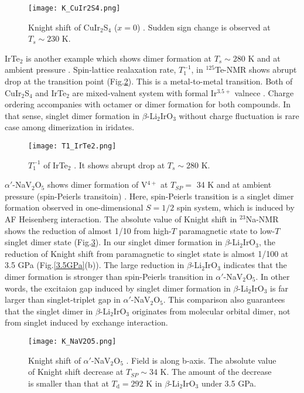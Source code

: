 \documentclass[a4,10.5pt]{report}
\begin{document}
\begin{figure}
  \centering
  \texttt{[image: K\_CuIr2S4.png]}
  \caption{Knight shift of CuIr$_2$S$_4$ ($x = 0$) \cite{Tsuji1997}. Sudden sign change is observed at $T_s \sim 230$ K.} 
  \label{K_CuIr2S4}
\end{figure}

IrTe$_2$ is another example which shows dimer formation at $T_s \sim 280$ K and at ambient pressure \cite{Pascut2014}.
Spin-lattice realaxation rate, $T^{-1}_1$, in ${}^{125}$Te-NMR shows abrupt drop at the transition point (Fig.\ref{T1_IrTe2}).
This is a metal-to-metal transition.
Both of CuIr$_2$S$_4$ and IrTe$_2$ are mixed-valnent system with formal Ir$^{3.5+}$ valnece \cite{Radaelli2002, Pascut2014}.
Charge ordering accompanies with octamer or dimer formation for both compounds.
In that sense, singlet dimer formation in $\beta$-Li$_2$IrO$_3$ without charge fluctuation is rare case among dimerization in iridates.

\begin{figure}
  \centering
  \texttt{[image: T1\_IrTe2.png]}
  \caption{$T^{-1}_1$ of IrTe$_2$ \cite{Mizuno2002}. It shows abrupt drop at $T_s \sim 280$ K.} 
  \label{T1_IrTe2}
\end{figure}

$\alpha'$-NaV$_2$O$_5$ shows dimer formation of V$^{4+}$ at $T_{SP} = $ 34 K and at ambient pressure (spin-Peierls transitoin) \cite{Isobe1996}.
Here, spin-Peierls transition is a singlet dimer formation observed in one-dimensional $S = 1/2$ spin system, which is induced by AF Heisenberg interaction.
The absolute value of Knight shift in ${}^{23}$Na-NMR shows the reduction of almost 1/10 from high-$T$ paramagnetic state to low-$T$ singlet dimer state (Fig.\ref{K_NaV2O5}).
In our singlet dimer formation in $\beta$-Li$_2$IrO$_3$, the reduction of Knight shift from paramagnetic to singlet state is almost 1/100 at 3.5 GPa (Fig.\ref{3.5GPa}(b)).
The large reduction in $\beta$-Li$_2$IrO$_3$ indicates that the dimer formation is stronger than spin-Peierls transition in $\alpha'$-NaV$_2$O$_5$.
In other words, the excitaion gap induced by singlet dimer formation in $\beta$-Li$_2$IrO$_3$ is far larger than singlet-triplet gap in $\alpha'$-NaV$_2$O$_5$.
This comparison also guarantees that the singlet dimer in $\beta$-Li$_2$IrO$_3$ originates from molecular orbital dimer, not from singlet induced by exchange interaction.

\begin{figure}
  \centering
  \texttt{[image: K\_NaV2O5.png]}
  \caption{Knight shift of $\alpha'$-NaV$_2$O$_5$ \cite{Ohama1997}. 
  Field is along b-axis.
  The absolute value of Knight shift decrease at $T_{SP} \sim 34$ K.
  The amount of the decrease is smaller than that at $T_\mathrm{d} = 292$ K in $\beta$-Li$_2$IrO$_3$ under 3.5 GPa.} 
  \label{K_NaV2O5}
\end{figure}
\end{document}
